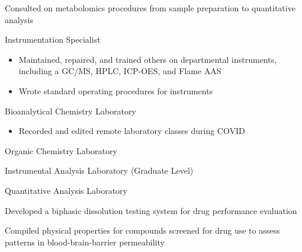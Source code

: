 \documentclass[]{deedy-resume-openfont}
\begin{document}
\begin{minipage}[t]{0.7\textwidth}
\begin{tightemize}
\item Consulted on metabolomics procedures from sample preparation to
quantitative analysis
\end{tightemize}

\begin{tightemize}
\item Instrumentation Specialist
    \begin{itemize}
    \item Maintained, repaired, and trained others on departmental instruments,
        including a GC/MS,
        HPLC, ICP-OES, and Flame AAS
    \item Wrote standard operating procedures for instruments
    \end{itemize}
\item Bioanalytical Chemistry Laboratory
    \begin{itemize}
    \item Recorded and edited remote laboratory classes during COVID
    \end{itemize}
\item Organic Chemistry Laboratory
\item Instrumental Analysis Laboratory (Graduate Level)
\item Quantitative Analysis Laboratory
\end{tightemize}
\sectionsep

\begin{tightemize}
\item Developed a biphasic dissolution testing system for drug performance
evaluation
\end{tightemize}
\sectionsep

\begin{tightemize}
\item Compiled physical properties for compounds screened for drug use to assess
patterns in blood-brain-barrier permeability
\end{tightemize}
\sectionsep

\end{minipage}
\hfill
\end{document}
